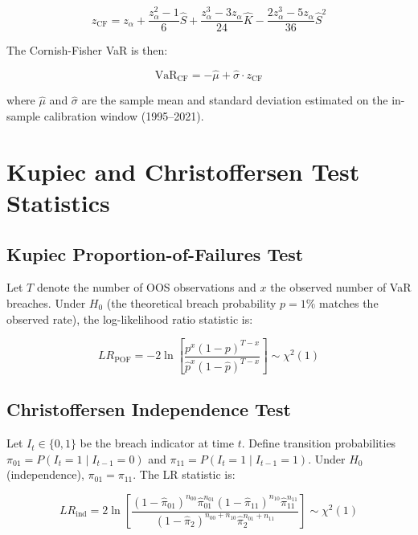 \documentclass[11pt]{article}
\newcommand{\VaR}{\text{VaR}}
\newcommand{\zCF}{z_{\text{CF}}}
\begin{document}
\begin{equation}
  \zCF = z_\alpha
       + \frac{z_\alpha^2 - 1}{6}\hat{S}
       + \frac{z_\alpha^3 - 3z_\alpha}{24}\hat{K}
       - \frac{2z_\alpha^3 - 5z_\alpha}{36}\hat{S}^2
  \label{eq:cf_expansion}
\end{equation}

The Cornish-Fisher VaR is then:

\begin{equation}
  \VaR_{\text{CF}} = -\hat{\mu} + \hat{\sigma} \cdot \zCF
  \label{eq:cf_var}
\end{equation}

where $\hat{\mu}$ and $\hat{\sigma}$ are the sample mean and standard deviation estimated
on the in-sample calibration window (1995--2021).

\section{Kupiec and Christoffersen Test Statistics}
\label{app:tests}

\subsection*{Kupiec Proportion-of-Failures Test}

Let $T$ denote the number of OOS observations and $x$ the observed number of VaR
breaches. Under $H_0$ (the theoretical breach probability $p = 1\%$ matches the observed
rate), the log-likelihood ratio statistic is:

\begin{equation}
  LR_{\text{POF}} = -2\ln\!\left[\frac{p^x(1-p)^{T-x}}{\hat{p}^x(1-\hat{p})^{T-x}}\right]
  \sim \chi^2(1)
  \label{eq:kupiec_lr}
\end{equation}

\subsection*{Christoffersen Independence Test}

Let $I_t \in \{0,1\}$ be the breach indicator at time $t$. Define transition probabilities
$\pi_{01} = P(I_t = 1 \mid I_{t-1} = 0)$ and $\pi_{11} = P(I_t = 1 \mid I_{t-1} = 1)$.
Under $H_0$ (independence), $\pi_{01} = \pi_{11}$. The LR statistic is:

\begin{equation}
  LR_{\text{ind}} = 2\ln\!\left[
    \frac{(1-\hat\pi_{01})^{n_{00}} \hat\pi_{01}^{n_{01}}
          (1-\hat\pi_{11})^{n_{10}} \hat\pi_{11}^{n_{11}}}
         {(1-\hat\pi_2)^{n_{00}+n_{10}} \hat\pi_2^{n_{01}+n_{11}}}
  \right] \sim \chi^2(1)
  \label{eq:christoffersen_lr}
\end{equation}
\end{document}

